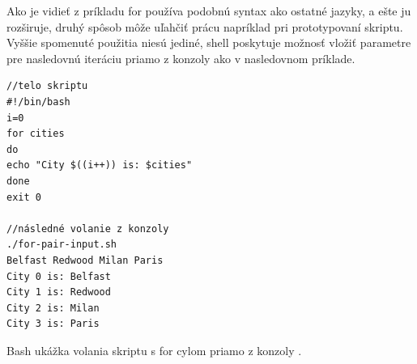 Ako je vidieť z príkladu for používa podobnú syntax ako ostatné jazyky, a ešte ju rozširuje, druhý spôsob môže uľahčiť prácu napríklad pri prototypovaní skriptu. Vyššie spomenuté použitia niesú jediné, shell poskytuje možnosť vložiť parametre pre nasledovnú iteráciu priamo z konzoly ako v nasledovnom príklade.
\newpage
\begin{algorithm}
	\begin{verbatim}
//telo skriptu
#!/bin/bash
i=0
for cities 
do
echo "City $((i++)) is: $cities"
done
exit 0

//následné volanie z konzoly
./for-pair-input.sh 
Belfast Redwood Milan Paris
City 0 is: Belfast
City 1 is: Redwood
City 2 is: Milan
City 3 is: Paris
	\end{verbatim}
	\caption{Bash ukážka volania skriptu s for cylom priamo z konzoly . \cite{mbash}}
	\label{alg:gen}
\end{algorithm}

